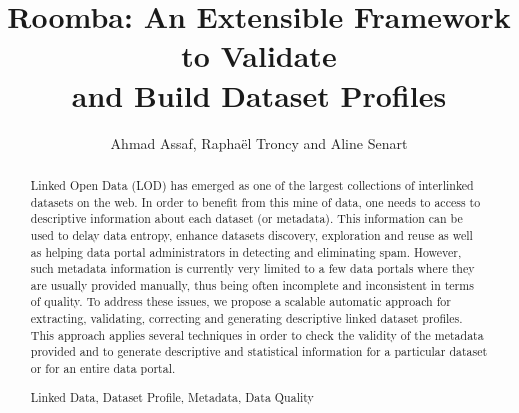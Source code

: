 \documentclass[runningheads,a4paper]{llncs}
\newcommand{\keywords}[1]{\par\addvspace\baselineskip
\noindent\keywordname\enspace\ignorespaces#1}
\begin{document}
\title{Roomba: An Extensible Framework to Validate\\ and Build Dataset Profiles}

\author{Ahmad Assaf, Rapha\"{e}l Troncy and Aline Senart}


\maketitle


\begin{abstract}
Linked Open Data (LOD) has emerged as one of the largest collections of interlinked datasets on the web. In order to benefit from this mine of data, one needs to access to descriptive information about each dataset (or metadata). This information can be used to delay data entropy, enhance datasets discovery, exploration and reuse as well as helping data portal administrators in detecting and eliminating spam. However, such metadata information is currently very limited to a few data portals where they are usually provided manually, thus being often incomplete and inconsistent in terms of quality. To address these issues, we propose a scalable automatic approach for extracting, validating, correcting and generating descriptive linked dataset profiles. This approach applies several techniques in order to check the validity of the metadata provided and to generate descriptive and statistical information for a particular dataset or for an entire data portal.

\keywords{Linked Data, Dataset Profile, Metadata, Data Quality}
\end{abstract}

\end{document}
